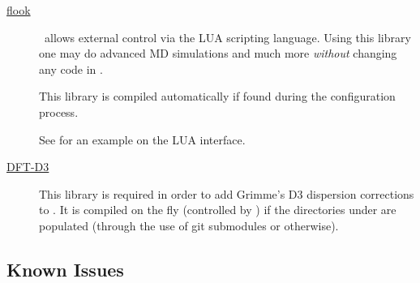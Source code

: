 \begin{description}
  \item[\href{https://github.com/electronicstructurelibrary/flook}{flook}]%
  \siesta\ allows external control via the LUA scripting language.
  Using this library one may do advanced MD simulations and much more
  \emph{without} changing any code in \siesta.

  This library is compiled automatically if found during the configuration process.

  See  for an example on the LUA interface.

  \item[\href{https://github.com/awvwgk/simple-dftd3}{DFT-D3}]%
  This library is required in order to add Grimme's D3 dispersion
  corrections to \siesta. It is compiled on the fly (controlled by
  ) if the directories
  under  are populated (through the use of git
  submodules or otherwise).

\end{description}


\subsection{Known Issues}
\label{sec:installissues}

